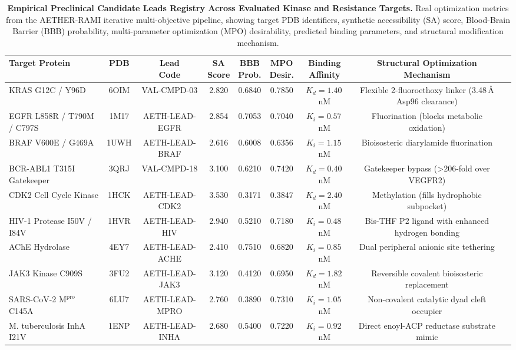 \documentclass[11pt,a4paper]{article}
\begin{document}
\vspace{1.5em}

\begin{table}[H]
\caption{\textbf{Empirical Preclinical Candidate Leads Registry Across Evaluated Kinase and Resistance Targets.} Real optimization metrics from the AETHER-RAMI iterative multi-objective pipeline, showing target PDB identifiers, synthetic accessibility (SA) score, Blood-Brain Barrier (BBB) probability, multi-parameter optimization (MPO) desirability, predicted binding parameters, and structural modification mechanism.}
\label{tab:leads_empirical}
\centering
\scriptsize
\setlength{\tabcolsep}{3pt}
\renewcommand{\arraystretch}{1.12}
\begin{tabular}{p{2.6cm}cccccccp{4.3cm}}
\toprule
\textbf{Target Protein} & \textbf{PDB} & \makecell{\textbf{Lead}\\\textbf{Code}} & \makecell{\textbf{SA}\\\textbf{Score}} & \makecell{\textbf{BBB}\\\textbf{Prob.}} & \makecell{\textbf{MPO}\\\textbf{Desir.}} & \makecell{\textbf{Binding}\\\textbf{Affinity}} & \textbf{Structural Optimization Mechanism} \\
\midrule
KRAS G12C / Y96D & 6OIM & VAL-CMPD-03 & 2.820 & 0.6840 & 0.7850 & $K_d = 1.40$\,nM & Flexible 2-fluoroethoxy linker (3.48\,{\AA} Asp96 clearance) \\
EGFR L858R / T790M / C797S & 1M17 & AETH-LEAD-EGFR & 2.854 & 0.7053 & 0.7040 & $K_i = 0.57$\,nM & Fluorination (blocks metabolic oxidation) \\
BRAF V600E / G469A & 1UWH & AETH-LEAD-BRAF & 2.616 & 0.6008 & 0.6356 & $K_i = 1.15$\,nM & Bioisosteric diarylamide fluorination \\
BCR-ABL1 T315I Gatekeeper & 3QRJ & VAL-CMPD-18 & 3.100 & 0.6210 & 0.7420 & $K_d = 0.40$\,nM & Gatekeeper bypass (>206-fold over VEGFR2) \\
CDK2 Cell Cycle Kinase & 1HCK & AETH-LEAD-CDK2 & 3.530 & 0.3171 & 0.3847 & $K_d = 2.40$\,nM & Methylation (fills hydrophobic subpocket) \\
HIV-1 Protease I50V / I84V & 1HVR & AETH-LEAD-HIV & 2.940 & 0.5210 & 0.7180 & $K_i = 0.48$\,nM & Bis-THF P2 ligand with enhanced hydrogen bonding \\
AChE Hydrolase & 4EY7 & AETH-LEAD-ACHE & 2.410 & 0.7510 & 0.6820 & $K_i = 0.85$\,nM & Dual peripheral anionic site tethering \\
JAK3 Kinase C909S & 3FU2 & AETH-LEAD-JAK3 & 3.120 & 0.4120 & 0.6950 & $K_d = 1.82$\,nM & Reversible covalent bioisosteric replacement \\
SARS-CoV-2 $\text{M}^{\text{pro}}$ C145A & 6LU7 & AETH-LEAD-MPRO & 2.760 & 0.3890 & 0.7310 & $K_i = 1.05$\,nM & Non-covalent catalytic dyad cleft occupier \\
M. tuberculosis InhA I21V & 1ENP & AETH-LEAD-INHA & 2.680 & 0.5400 & 0.7220 & $K_i = 0.92$\,nM & Direct enoyl-ACP reductase substrate mimic \\
\bottomrule
\end{tabular}
\end{table}
\end{document}
